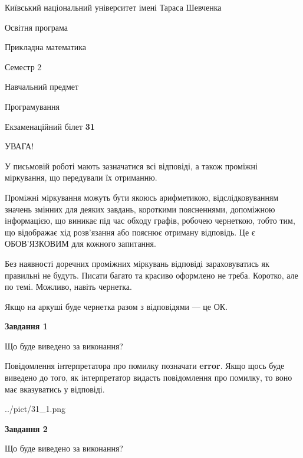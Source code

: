 \documentclass[12pt, ukrainian]{article}
\begin{document}
{{\begin {small}\par
{ \center  Київський національний університет імені Тараса Шевченка \par}
{\parbox {5 cm}{Освітня програма \hfill}{\parbox {7 cm}{Прикладна математика \hfill}}\parbox {6 cm}{\hfill Семестр 2}}\par
{\parbox {5 cm} {Навчальний предмет \hfill}\parbox {7 cm}{Програмування \hfill}\parbox {6cm}{\hfill}\par}\vspace{-7pt} \end{small}}{\center Екзаменаційний білет \No \textbf
{ 31 }\par}}
{
\begin {large}
УВАГА!

У письмовій роботі мають зазначатися всі відповіді, а також проміжні міркування, що передували їх отриманню.

Проміжні міркування можуть бути якоюсь арифметикою, відслідковуванням зна\-чень змінних для деяких завдань,
короткими поясненнями, допоміжною інформацією, що виникає під час обходу графів, робочею чернеткою,
тобто тим, що відображає хід розв’язання або пояснює отриману відповідь.
Це є ОБОВ’ЯЗКОВИМ для кожного запитання.

Без наявності доречних проміжних міркувань відповіді зараховуватись як правиль\-ні не будуть.
Писати багато та красиво оформлено не треба. Коротко, але по темі. Можли\-во, навіть чернетка.

Якщо на аркуші буде чернетка разом з відповідями --- це ОК.

\newpage

{\begin {center}\textbf{Завдання 1}\end {center}}\par
Що буде виведено за виконання?

Повідомлення інтерпретатора про помилку позначати \textbf{error}.
Якщо щось буде виведено до того, як інтерпретатор видасть повідомлення про помилку, 
то воно має вказуватись у відповіді. \par


\begin{center}
	{../pict/31_1.png}
\end{center}
\newpage

{\begin {center}\textbf{Завдання 2}\end {center}}\par
Що буде виведено за виконання?


\end{large}}
\end{document}
